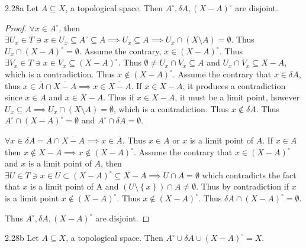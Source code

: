 \documentclass{article}
\begin{document}
\bigskip

\begin{claim}{2.28a}\label{Claim 2.2a.}
    Let $A \subseteq X$, a topological space. Then $A^\circ, \delta A, (X - A)^\circ$ are disjoint.    
\end{claim}
\begin{proof}
    $\forall x \in A^\circ$, then $\exists U_x \in T \ni x \in U_x \subseteq A^\circ \subseteq A \implies U_x \subseteq A \implies U_x \cap \left(X \setminus A\right) = \emptyset$. Thus $U_x \cap (X - A)^\circ = \emptyset$. Assume the contrary, $x \in (X - A)^\circ$. Thus $\exists V_x \in T \ni x \in V_x \subseteq (X - A)^\circ$. Thus $\emptyset \neq U_x \cap V_x \subseteq A$ and $U_x \cap V_x \subseteq X - A$, which is a contradiction. Thus $x \not \in (X - A)^\circ$. Assume the contrary that $x \in \delta A$, thus $x \in \overline{A} \cap \overline{X - A} \implies x \in \overline{X - A}$. If $x \in X - A$, it produces a contradiction since $x \in A$ and $x \in X -A$. Thus if $x \in \overline{X -A}$, it must be a limit point, however $U_x \subseteq A \implies U_x \cap \left(X \setminus A\right) = \emptyset$, which is a contradiction. Thus $x \not \in \delta A$. Thus $A^\circ \cap (X - A)^\circ = \emptyset$ and $A^\circ \cap \delta A = \emptyset$.

    $\forall x \in \delta A = \overline{A} \cap \overline{X - A}\implies x \in \overline{A}$. Thus $x \in A$ or $x$ is a limit point of $A$. If $x \in A$ then $x \not \in X - A \implies x \not \in (X - A)^\circ$. Assume the contrary that $x \in (X - A)^{\circ}$ and $x$ is a limit point of $A$, then $\exists U \in T \ni x \in U \subset (X - A)^\circ \subseteq X - A \implies U \cap A = \emptyset$ which contradicts the fact that $x$ is a limit point of A and $(U \setminus \left\{ x \right\}) \cap A \neq \emptyset$. Thus by contradiction if $x$ is a limit point $x \not \in (X - A)^\circ$. Thus $x \not \in (X - A)^\circ$. Thus $\delta A \cap (X - A)^\circ = \emptyset$. 
    
    Thus $A^\circ, \delta A, (X - A)^\circ$ are disjoint. 
\end{proof}
\begin{claim}{2.28b}\label{Claim 2.28b.}
    Let $A \subseteq X$, a topological space. Then $A^\circ \cup \delta A \cup (X - A)^\circ = X$. 
\end{claim}
\end{document}
